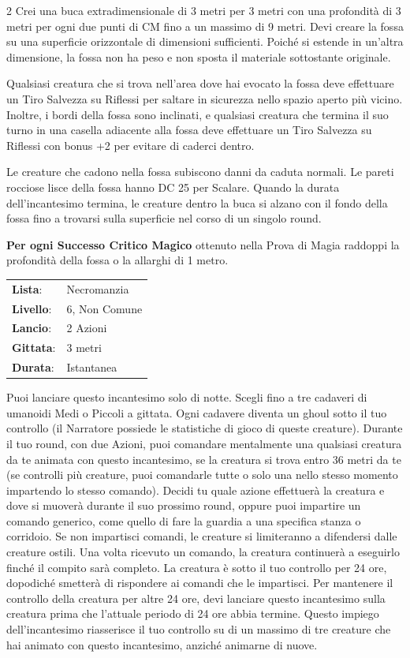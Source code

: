 \begin{multicols}{2}
Crei una buca extradimensionale di 3 metri per 3 metri con una profondità di 3 metri per ogni due punti di CM fino a un massimo di 9 metri. Devi creare la fossa su una superficie orizzontale di dimensioni sufficienti. Poiché si estende in un'altra dimensione, la fossa non ha peso e non sposta il materiale sottostante originale.

Qualsiasi creatura che si trova nell'area dove hai evocato la fossa deve effettuare un Tiro Salvezza su Riflessi per saltare in sicurezza nello spazio aperto più vicino. Inoltre, i bordi della fossa sono inclinati, e qualsiasi creatura che termina il suo turno in una casella adiacente alla fossa deve effettuare un Tiro Salvezza su Riflessi con bonus +2 per evitare di caderci dentro.

Le creature che cadono nella fossa subiscono danni da caduta normali. Le pareti rocciose lisce della fossa hanno DC 25 per Scalare. Quando la durata dell'incantesimo termina, le creature dentro la buca si alzano con il fondo della fossa fino a trovarsi sulla superficie nel corso di un singolo round.

\textbf{Per ogni Successo Critico Magico} ottenuto nella Prova di Magia raddoppi la profondità della fossa o la allarghi di 1 metro.

\noindent\begin{tabularx}{\linewidth}{p{1.9cm}X}
	\rowcolor{gray!20}\textbf{Lista}: & Necromanzia \\
	\textbf{Livello}: & 6, Non Comune \\
	\rowcolor{gray!20}\textbf{Lancio}: & 2 Azioni \\
	\textbf{Gittata}: & 3 metri \\
	\rowcolor{gray!20}\textbf{Durata}: & Istantanea \\
\end{tabularx}\smallskip

Puoi lanciare questo incantesimo solo di notte. Scegli fino a tre cadaveri di umanoidi Medi o Piccoli a gittata. Ogni cadavere diventa un ghoul sotto il tuo controllo (il Narratore possiede le statistiche di gioco di queste creature). Durante il tuo round, con due Azioni, puoi comandare mentalmente una qualsiasi creatura da te animata con questo incantesimo, se la creatura si trova entro 36 metri da te (se controlli più creature, puoi comandarle tutte o solo una nello stesso momento impartendo lo stesso comando). Decidi tu quale azione effettuerà la creatura e dove si muoverà durante il suo prossimo round, oppure puoi impartire un comando generico, come quello di fare la guardia a una specifica stanza o corridoio. Se non impartisci comandi, le creature si limiteranno a difendersi dalle creature ostili. Una volta ricevuto un comando, la creatura continuerà a eseguirlo finché il compito sarà completo. La creatura è sotto il tuo controllo per 24 ore, dopodiché smetterà di rispondere ai comandi che le impartisci. Per mantenere il controllo della creatura per altre 24 ore, devi lanciare questo incantesimo sulla creatura prima che l'attuale periodo di 24 ore abbia termine. Questo impiego dell'incantesimo riasserisce il tuo controllo su di un massimo di tre creature che hai animato con questo incantesimo, anziché animarne di nuove.


\end{multicols}
